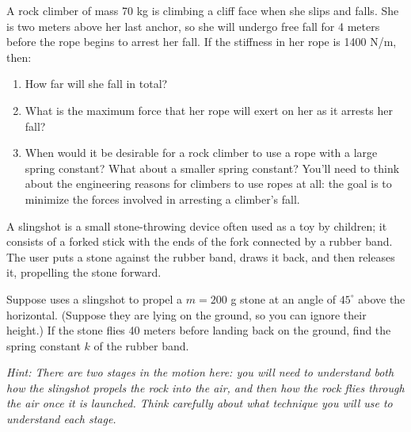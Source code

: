 \documentclass[12pt]{article}
\begin{document}
\Large
\centerline{}
\normalsize
\centerline{}



{A rock climber of mass 70 kg is climbing a cliff face when she slips and falls. She is two meters above her last anchor, so she will undergo free fall for 4 meters before the rope begins to arrest her fall. If the stiffness in her rope is 1400 N/m, then:}
\begin{enumerate}
	\item{How far will she fall in total?}
	\vspace{2in}
	
	\item{What is the maximum force that her rope will exert on her as it arrests her fall?}
	\vspace{1.5in}
	
	\item When would it be desirable for a rock climber to use a rope with a large spring constant? What about a smaller spring constant? You'll need to think about 
	the engineering reasons for climbers to use ropes at all: the goal is to minimize the forces involved in arresting a climber's fall.
\end{enumerate}

\newpage

A slingshot is a small stone-throwing device often used as a toy by children; it consists of a forked stick with the ends of the fork connected by a rubber band. The user puts a stone against the rubber band, draws it back,
and then releases it, propelling the stone forward.

Suppose uses a slingshot to propel a $m=200$ g stone at an angle of $45^\circ$ above the horizontal. (Suppose they are lying on the ground, so you can ignore their height.) If the stone flies 40 meters before landing back on the ground, find the spring constant $k$ of the rubber band.

{\it Hint: There are two stages in the motion here: you will need to understand both how the slingshot propels the rock into the air, and then how the rock flies through the air once it is launched. Think carefully about what technique you will use to understand each stage.}


\newpage



%
%
%
%
\end{document}
